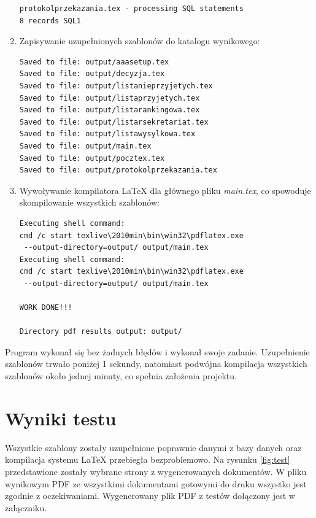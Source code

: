 \begin{enumerate}
\begin{lstlisting}
protokolprzekazania.tex - processing SQL statements
8 records SQL1

 \end{lstlisting}
 
   \item Zapisywanie uzupełnionych szablonów do katalogu wynikowego:
 \begin{lstlisting}
Saved to file: output/aaasetup.tex
Saved to file: output/decyzja.tex
Saved to file: output/listanieprzyjetych.tex
Saved to file: output/listaprzyjetych.tex
Saved to file: output/listarankingowa.tex
Saved to file: output/listarsekretariat.tex
Saved to file: output/listawysylkowa.tex
Saved to file: output/main.tex
Saved to file: output/pocztex.tex
Saved to file: output/protokolprzekazania.tex

 \end{lstlisting}
 
   \item Wywoływanie kompilatora LaTeX dla głównego pliku \emph{main.tex}, co spowoduje skompilowanie wszystkich szablonów:
 \begin{lstlisting}
Executing shell command:
cmd /c start texlive\2010min\bin\win32\pdflatex.exe
 --output-directory=output/ output/main.tex
Executing shell command:
cmd /c start texlive\2010min\bin\win32\pdflatex.exe
 --output-directory=output/ output/main.tex

WORK DONE!!!

Directory pdf results output: output/
 \end{lstlisting}
\end{enumerate}
Program wykonał się bez żadnych błędów i wykonał swoje zadanie. Uzupełnienie szablonów trwało poniżej 1 sekundy, natomiast podwójna kompilacja wszystkich szablonów około jednej minuty, co spełnia założenia projektu. 

\section{Wyniki testu}
Wszystkie szablony zostały uzupełnione poprawnie danymi z bazy danych oraz kompilacja systemu LaTeX przebiegła bezproblemowo. Na rysunku \ref{fig:test} przedstawione zostały wybrane strony z wygenerowanych dokumentów. W pliku wynikowym PDF ze wszystkimi dokumentami gotowymi do druku wszystko jest zgodnie z oczekiwaniami. Wygenerowany plik PDF z testów dołączony jest w załączniku.

